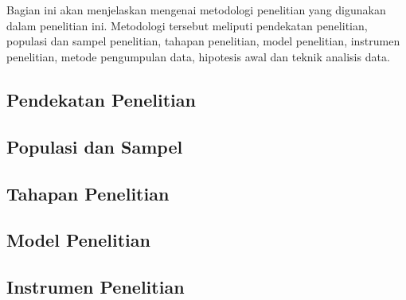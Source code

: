\chapter{\babTiga}
Bagian ini akan menjelaskan mengenai metodologi penelitian yang digunakan dalam penelitian ini. Metodologi tersebut meliputi pendekatan penelitian, populasi dan sampel penelitian, tahapan penelitian, model penelitian, instrumen penelitian, metode pengumpulan data, hipotesis awal dan teknik analisis data.
\section{Pendekatan Penelitian}

\section{Populasi dan Sampel}

\section{Tahapan Penelitian}

\section{Model Penelitian}

\section{Instrumen Penelitian}

